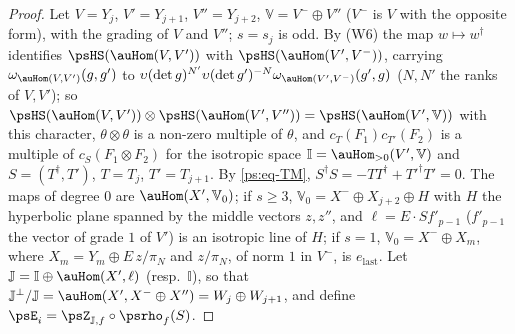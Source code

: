 \documentclass[10pt]{amsart}
\theoremstyle{definition}
\theoremstyle{remark}
\begin{document}
\begin{proof}
Let $V=Y_j$, $V'=Y_{j+1}$, $V''=Y_{j+2}$, $\mathbb V=V^-\oplus V''$ ($V^-$ is $V$ with the opposite
form), with the grading of $V$ and $V''$; $s=s_j$ is odd. By (W6) the map $w\mapsto w^\dagger$ identifies
$\psHS(\auHom(V,V'))$ with $\psHS(\auHom(V',V^-))$, carrying $\omega_{\auHom(V,V')}(g,g')$ to
$\upsilon(\det g)^{N'}\upsilon(\det g')^{-N}\omega_{\auHom(V',V^-)}(g',g)$ ($N,N'$ the ranks of
$V,V'$); so $\psHS(\auHom(V,V'))\otimes\psHS
(\auHom(V',V''))=\psHS(\auHom(V',\mathbb V))$ with this character, $\theta\otimes\theta$ is a non-zero multiple of
$\theta$, and $c_T(F_1)c_{T'}(F_2)$ is a multiple of $c_S(F_1\otimes F_2)$ for the isotropic space
$\mathbb I=\auHom_{>0}(V',\mathbb V)$ and $S=(T^\dagger,T')$, $T=T_j$, $T'=T_{j+1}$. By
\eqref{ps:eq-TM}, $S^\dagger S=-TT^\dagger+T'^\dagger T'=0$. The maps of degree $0$ are
$\auHom(X',\mathbb V_0)$; if $s\ge3$, $\mathbb V_0=X^-\oplus X_{j+2}\oplus H$ with $H$ the
hyperbolic plane spanned by the middle vectors $z,z''$, and $\ell=E\cdot Sf'_{p-1}$ ($f'_{p-1}$
the vector of grade $1$ of $V'$) is an isotropic line of $H$; if $s=1$, $\mathbb V_0=X^-\oplus
X_m$, where $X_m=Y_m\oplus E\,z/\pi_N$ and $z/\pi_N$, of norm $1$ in $V^-$, is
$e_{\mathrm{last}}$. Let $\mathbb J=\mathbb I\oplus\auHom(X',\ell)$ (resp.\ $\mathbb I$), so that
$\mathbb J^\perp/\mathbb J=\auHom(X',X^-\oplus X'')=W_j\oplus W_{j+1}$, and define
$\psE_i=\psZ_{\mathbb J,f}\circ\psrho_f(S)$.


\end{proof}
\end{document}
